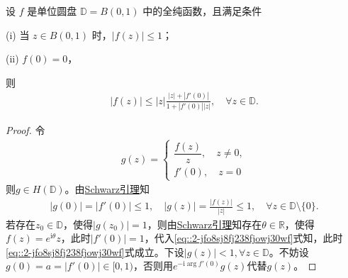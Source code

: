 \documentclass[../../main.tex]{subfiles}%
\begin{document}
\begin{corollary}[更精确的Schwarz引理]\label{theorem:更精确的Schwarz引理}
设 \( f \) 是单位圆盘 \(\mathbb{D} = B(0,1) \) 中的全纯函数，且满足条件

(i) 当 \( z \in B(0,1) \) 时，\( |f(z)| \leqslant  1 \)；

(ii) \( f(0) = 0 \)，

则
\begin{align}\label{eq::2-jfo8sj8fj238fjowj30wf}
\left| f\left( z \right) \right|\leqslant \left| z \right|\frac{\left| z \right|+\left| f' \left( 0 \right) \right|}{1+\left| f'\left( 0 \right) \right|\left| z \right|},\quad \forall z\in \mathbb{D}.
\end{align}
\end{corollary}
\begin{proof}

令
\begin{align*}
g(z)=
\begin{cases}
\dfrac{f(z)}{z},\quad z\neq 0,\\
f'(0),\quad z=0
\end{cases}
\end{align*}
则$g\in H(\mathbb{D})$。由\hyperref[theorem:Schwarz引理-定理4.5.3]{Schwarz引理}知
\begin{align*}
|g(0)|=|f'(0)|\leqslant 1,\quad |g(z)|=\frac{|f(z)|}{|z|}\leqslant 1,\quad \forall z\in\mathbb{D}\setminus\{0\}.
\end{align*}
若存在$z_0\in\mathbb{D}$，使得$|g(z_0)|=1$，则由\hyperref[theorem:Schwarz引理-定理4.5.3]{Schwarz引理}知存在$\theta\in\mathbb{R}$，使得$f(z)=e^{\mathrm{i}\theta}z$，此时$|f'(0)|=1$，代入\eqref{eq::2-jfo8sj8fj238fjowj30wf}式知，此时\eqref{eq::2-jfo8sj8fj238fjowj30wf}式成立。下设$|g(z)|<1,\forall z\in\mathbb{D}$。不妨设$g(0)=a=|f'(0)|\in[0,1)$，否则用$e^{-\mathrm{i}\arg f'(0)}g(z)$代替$g(z)$。


\end{proof}
\end{document}
